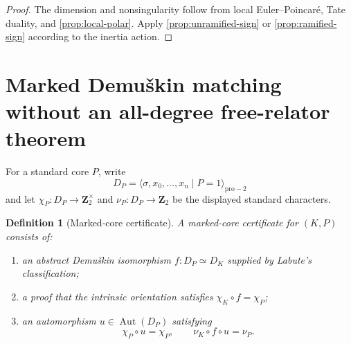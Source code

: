 \documentclass[11pt,reqno]{amsart}
\newtheorem{definition}[theorem]{Definition}
\theoremstyle{remark}
\numberwithin{equation}{section}
\newcommand{\Z}{\mathbf Z}
\newcommand{\Aut}{\operatorname{Aut}}
\begin{document}
\begin{proof}
The dimension and nonsingularity follow from local Euler--Poincar\'e,
Tate duality, and \cref{prop:local-polar}.  Apply
\cref{prop:unramified-sign} or \cref{prop:ramified-sign} according to the
inertia action.
\end{proof}

\section{Marked Demu\v{s}kin matching without an all-degree free-relator theorem}
\label{sec:marked}

For a standard core \(P\), write
\[
 D_P=\langle\sigma,x_0,\ldots,x_n\mid P=1\rangle_{\mathrm{pro}-2}
\]
and let \(\chi_P:D_P\to\Z_2^\times\) and
\(\nu_P:D_P\to\Z_2\) be the displayed standard characters.

\begin{definition}[Marked-core certificate]\label{def:core-certificate}
A marked-core certificate for \((K,P)\) consists of:
\begin{enumerate}
\item an abstract Demu\v{s}kin isomorphism \(f:D_P\simeq D_K\) supplied by
Labute's classification;
\item a proof that the intrinsic orientation satisfies
\(\chi_K\circ f=\chi_P\);
\item an automorphism \(u\in\Aut(D_P)\) satisfying
\[
 \chi_P\circ u=\chi_P,
 \qquad \nu_K\circ f\circ u=\nu_P.
\]
\end{enumerate}
\end{definition}
\end{document}
